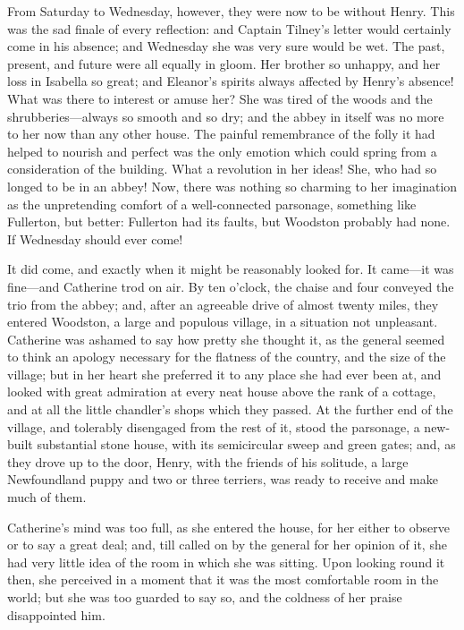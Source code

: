  From Saturday to Wednesday, however, they were now to be without Henry. This was the sad finale of every reflection: and Captain Tilney's letter would certainly come in his absence; and Wednesday she was very sure would be wet. The past, present, and future were all equally in gloom. Her brother so unhappy, and her loss in Isabella so great; and Eleanor's spirits always affected by Henry's absence! What was there to interest or amuse her? She was tired of the woods and the shrubberies—always so smooth and so dry; and the abbey in itself was no more to her now than any other house. The painful remembrance of the folly it had helped to nourish and perfect was the only emotion which could spring from a consideration of the building. What a revolution in her ideas! She, who had so longed to be in an abbey! Now, there was nothing so charming to her imagination as the unpretending comfort of a well-connected parsonage, something like Fullerton, but better: Fullerton had its faults, but Woodston probably had none. If Wednesday should ever come! 

 It did come, and exactly when it might be reasonably looked for. It came—it was fine—and Catherine trod on air. By ten o'clock, the chaise and four conveyed the trio from the abbey; and, after an agreeable drive of almost twenty miles, they entered Woodston, a large and populous village, in a situation not unpleasant. Catherine was ashamed to say how pretty she thought it, as the general seemed to think an apology necessary for the flatness of the country, and the size of the village; but in her heart she preferred it to any place she had ever been at, and looked with great admiration at every neat house above the rank of a cottage, and at all the little chandler's shops which they passed. At the further end of the village, and tolerably disengaged from the rest of it, stood the parsonage, a new-built substantial stone house, with its semicircular sweep and green gates; and, as they drove up to the door, Henry, with the friends of his solitude, a large Newfoundland puppy and two or three terriers, was ready to receive and make much of them. 

 Catherine's mind was too full, as she entered the house, for her either to observe or to say a great deal; and, till called on by the general for her opinion of it, she had very little idea of the room in which she was sitting. Upon looking round it then, she perceived in a moment that it was the most comfortable room in the world; but she was too guarded to say so, and the coldness of her praise disappointed him. 

